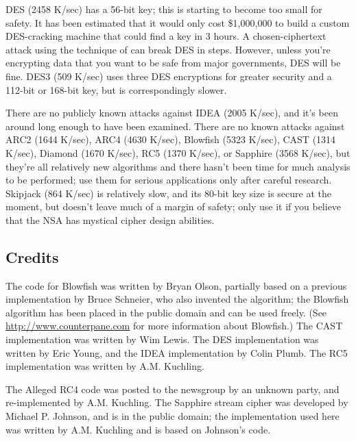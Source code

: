 \documentclass{howto}
\begin{document}
DES (2458 K/sec) has a 56-bit key; this is starting to become too small
for safety.  It has been estimated that it would only cost \$1,000,000 to
build a custom DES-cracking machine that could find a key in 3 hours.  A
chosen-ciphertext attack using the technique of  can break DES in  steps.  However,
unless you're encrypting data that you want to be safe from major
governments, DES will be fine. DES3 (509 K/sec) uses three DES
encryptions for greater security and a 112-bit or 168-bit key, but is
correspondingly slower.

There are no publicly known attacks against IDEA (2005 K/sec), and
it's been around long enough to have been examined.  There are no
known attacks against ARC2 (1644 K/sec), ARC4 (4630 K/sec), Blowfish
(5323 K/sec), CAST (1314 K/sec), Diamond (1670 K/sec), RC5 (1370
K/sec), or Sapphire (3568 K/sec), but they're all relatively new
algorithms and there hasn't been time for much analysis to be
performed; use them for serious applications only after careful
research.  Skipjack (864 K/sec) is relatively slow, and its 80-bit key size
is secure at the moment, but doesn't leave much of a margin of safety;
only use it if you believe that the NSA has mystical cipher design
abilities.


\subsection{Credits}
The code for Blowfish was written by Bryan Olson, partially based on a
previous implementation by Bruce Schneier, who also invented the
algorithm; the Blowfish algorithm has been placed in the public domain
and can be used freely.  (See \url{http://www.counterpane.com} for more
information about Blowfish.)  The CAST implementation was written by 
Wim Lewis.  The DES implementation was written by Eric Young, and the
IDEA implementation by Colin Plumb. The RC5 implementation
was written by A.M. Kuchling.

The Alleged RC4 code was posted to the  newsgroup by an
unknown party, and re-implemented by A.M. Kuchling.  The Sapphire stream
cipher was developed by Michael P. Johnson, and is in the public domain;
the implementation used here was written by A.M. Kuchling and is based
on Johnson's code.
\end{document}

